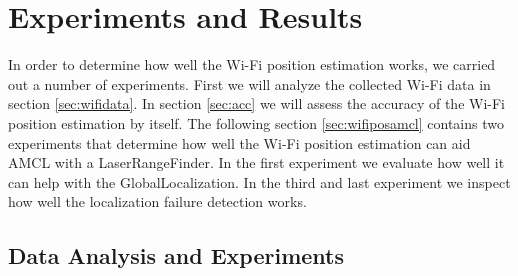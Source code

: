 \chapter{Experiments and Results} %
\label{Chapter4}
In order to determine how well the Wi-Fi position estimation works, we carried out a number of experiments. First we will analyze the collected Wi-Fi data in section \ref{sec:wifidata}. 
In section \ref{sec:acc} we will assess the accuracy of the Wi-Fi position estimation by itself.
The following section \ref{sec:wifiposamcl} contains two experiments that determine how well the Wi-Fi position estimation can aid AMCL with a \gls{LaserRangeFinder}. In the first experiment we evaluate how well it can help with the \gls{GlobalLocalization}. In the third and last experiment we inspect how well the localization failure detection works. 
\section{Data Analysis and Experiments}

